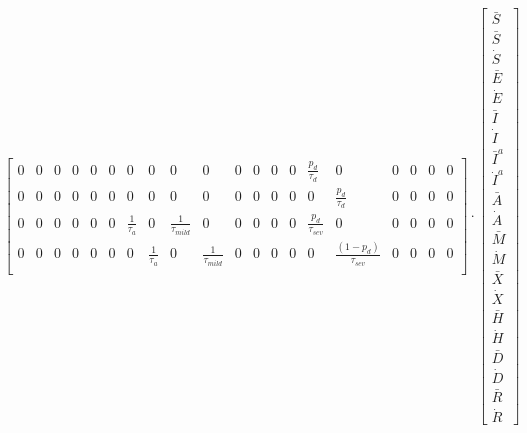 \documentclass[notitlepage, superscriptaddress]{revtex4-2}
\begin{document}
\begin{eqnarray}
\begin{bmatrix}
0 & 0 & 0 & 0 & 0 & 0 & 0 & 0 & 0 & 0 & 0 & 0 & 0 & 0 & \frac{p_{d}}{\tau_{d}} & 0 & 0 & 0 & 0 & 0 \\ 
0 & 0 & 0 & 0 & 0 & 0 & 0 & 0 & 0 & 0 & 0 & 0 & 0 & 0 & 0 & \frac{p_{d}}{\tau_{d}} & 0 & 0 & 0 & 0 \\
0 & 0 & 0 & 0 & 0 & 0 & \frac{1}{\tau_{a}} & 0 & \frac{1}{\tau_{mild}} & 0 & 0 & 0 & 0 & 0 & \frac{p_{d}}{\tau_{sev}} & 0 & 0 & 0 & 0 & 0 \\
0 & 0 & 0 & 0 & 0 & 0 & 0 & \frac{1}{\tau_{a}} & 0 & \frac{1}{\tau_{mild}} & 0 & 0 & 0 & 0 & 0 & \frac{(1-p_{d})}{\tau_{sev}} & 0 & 0 & 0 & 0 \nonumber \\
\end{bmatrix}
%
\cdot
\begin{bmatrix}
\bar{S} \\
\bar{S} \\
\dot{S} \\
\bar{E} \\
\dot{E} \\
\bar{I} \\
\dot{I} \\
\bar{I}^{a} \\
\dot{I}^{a} \\
\bar{A} \\
\dot{A} \\
\bar{M} \\
\dot{M} \\
\bar{X} \\
\dot{X} \\
\bar{H} \\
\dot{H} \\
\bar{D} \\
\dot{D} \\
\bar{R} \\
\dot{R}

\end{bmatrix}
\end{eqnarray}
\end{document}
